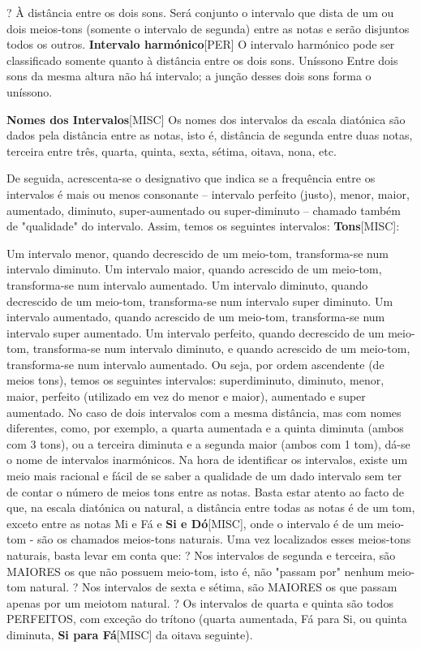 \documentclass[a4paper,12pt]{article}
\begin{document}
? À distância entre os dois sons. Será conjunto o intervalo que dista de um ou dois meios-tons (somente o intervalo de segunda) entre as notas e serão disjuntos todos os outros. \textbf{Intervalo harmónico}\textsc{[PER]} O intervalo harmónico pode ser classificado somente quanto à distância entre os dois sons. Uníssono Entre dois sons da mesma altura não há intervalo; a junção desses dois sons forma o uníssono.

\textbf{Nomes dos Intervalos}\textsc{[MISC]} Os nomes dos intervalos da escala diatónica são dados pela distância entre as notas, isto é, distância de segunda entre duas notas, terceira entre três, quarta, quinta, sexta, sétima, oitava, nona, etc.

De seguida, acrescenta-se o designativo que indica se a frequência entre os intervalos é mais ou menos consonante -- intervalo perfeito (justo), menor, maior, aumentado, diminuto, super-aumentado ou super-diminuto -- chamado também de "qualidade" do intervalo. Assim, temos os seguintes intervalos: \textbf{Tons}\textsc{[MISC]}:

Um intervalo menor, quando decrescido de um meio-tom, transforma-se num intervalo diminuto. Um intervalo maior, quando acrescido de um meio-tom, transforma-se num intervalo aumentado. Um intervalo diminuto, quando decrescido de um meio-tom, transforma-se num intervalo super diminuto. Um intervalo aumentado, quando acrescido de um meio-tom, transforma-se num intervalo super aumentado. Um intervalo perfeito, quando decrescido de um meio-tom, transforma-se num intervalo diminuto, e quando acrescido de um meio-tom, transforma-se num intervalo aumentado. Ou seja, por ordem ascendente (de meios tons), temos os seguintes intervalos: superdiminuto, diminuto, menor, maior, perfeito (utilizado em vez do menor e maior), aumentado e super aumentado. No caso de dois intervalos com a mesma distância, mas com nomes diferentes, como, por exemplo, a quarta aumentada e a quinta diminuta (ambos com 3 tons), ou a terceira diminuta e a segunda maior (ambos com 1 tom), dá-se o nome de intervalos inarmónicos. Na hora de identificar os intervalos, existe um meio mais racional e fácil de se saber a qualidade de um dado intervalo sem ter de contar o número de meios tons entre as notas. Basta estar atento ao facto de que, na escala diatónica ou natural, a distância entre todas as notas é de um tom, exceto entre as notas Mi e Fá e \textbf{Si e Dó}\textsc{[MISC]}, onde o intervalo é de um meio-tom - são os chamados meios-tons naturais. Uma vez localizados esses meios-tons naturais, basta levar em conta que: ? Nos intervalos de segunda e terceira, são MAIORES os que não possuem meio-tom, isto é, não "passam por" nenhum meio-tom natural. ? Nos intervalos de sexta e sétima, são MAIORES os que passam apenas por um meiotom natural. ? Os intervalos de quarta e quinta são todos PERFEITOS, com exceção do trítono (quarta aumentada, Fá para Si, ou quinta diminuta, \textbf{Si para Fá}\textsc{[MISC]} da oitava seguinte).
\end{document}
